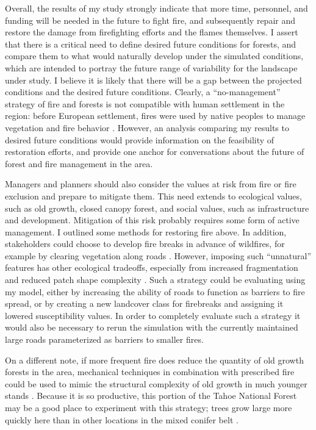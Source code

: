 Overall, the results of my study strongly indicate that more time, personnel, and funding will be needed in the future to fight fire, and subsequently repair and restore the damage from firefighting efforts and the flames themselves. I assert that there is a critical need to define desired future conditions for forests, and compare them to what would naturally develop under the simulated conditions, which are intended to portray the future range of variability for the landscape under study. I believe it is likely that there will be a gap between the projected conditions and the desired future conditions. Clearly, a ``no-management'' strategy of fire and forests is not compatible with human settlement in the region: before European settlement, fires were used by native peoples to manage vegetation and fire behavior \citep{Anderson1996}. However, an analysis comparing my results to desired future conditions would provide information on the feasibility of restoration efforts, and provide one anchor for conversations about the future of forest and fire management in the area.



Managers and planners should also consider the values at risk from fire or fire exclusion and prepare to mitigate them. This need extends to ecological values, such as old growth, closed canopy forest, and social values, such as infrastructure and development. Mitigation of this risk probably requires some form of active management. I outlined some methods for restoring fire above. In addition, stakeholders could choose to develop fire breaks in advance of wildfires, for example by clearing vegetation along roads \citep{Conard2003}. However, imposing such ``unnatural'' features has other ecological tradeoffs, especially from increased fragmentation and reduced patch shape complexity \citep{Trombulak2000}. Such a strategy could be evaluating using my model, either by increasing the ability of roads to function as barriers to fire spread, or by creating a new landcover class for firebreaks and assigning it lowered susceptibility values. In order to completely evaluate such a strategy it would also be necessary to rerun the simulation with the currently maintained large roads parameterized as barriers to smaller fires.

On a different note, if more frequent fire does reduce the quantity of old growth forests in the area, mechanical techniques in combination with prescribed fire could be used to mimic the structural complexity of old growth in much younger stands \citep{Franklin2002}. Because it is so productive, this portion of the Tahoe National Forest may be a good place to experiment with this strategy; trees grow large more quickly here than in other locations in the mixed conifer belt \citep{PRISMClimateGroup2004,Littell2012}.

